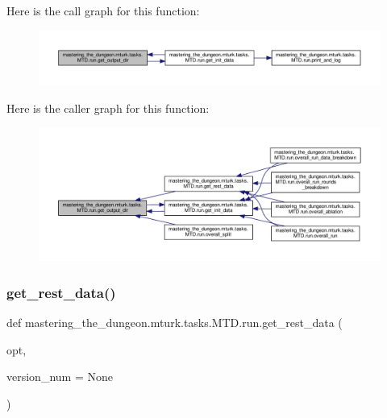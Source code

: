 Here is the call graph for this function\+:
\nopagebreak
\begin{figure}[H]
\begin{center}
\leavevmode
\includegraphics[width=350pt]{namespacemastering__the__dungeon_1_1mturk_1_1tasks_1_1MTD_1_1run_a62781f44b43636ee721e462700efeeac_cgraph}
\end{center}
\end{figure}
Here is the caller graph for this function\+:
\nopagebreak
\begin{figure}[H]
\begin{center}
\leavevmode
\includegraphics[width=350pt]{namespacemastering__the__dungeon_1_1mturk_1_1tasks_1_1MTD_1_1run_a62781f44b43636ee721e462700efeeac_icgraph}
\end{center}
\end{figure}
\mbox{\label{namespacemastering__the__dungeon_1_1mturk_1_1tasks_1_1MTD_1_1run_a7d8855ab1a7622d4b811085a733b8483}} 
\subsubsection{\texorpdfstring{get\+\_\+rest\+\_\+data()}{get\_rest\_data()}}
{\footnotesize\ttfamily def mastering\+\_\+the\+\_\+dungeon.\+mturk.\+tasks.\+M\+T\+D.\+run.\+get\+\_\+rest\+\_\+data (\begin{DoxyParamCaption}\item[{}]{opt,  }\item[{}]{version\+\_\+num = {\ttfamily None} }\end{DoxyParamCaption})}



